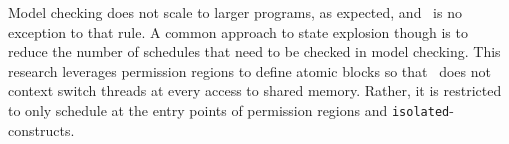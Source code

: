 Model checking does not scale to larger programs, as expected, and
\jpf\ is no exception to that rule. A common approach to state
explosion though is to reduce the number of schedules that need to be
checked in model checking. This research leverages permission regions
to define atomic blocks so that \jpf\ does not context switch threads
at every access to shared memory. Rather, it is restricted to only
schedule at the entry points of permission regions and
\texttt{isolated}-constructs.

